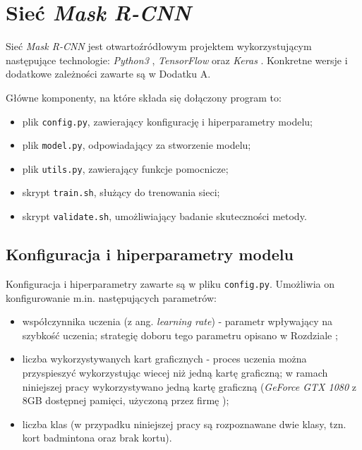 \newpage
\section{Sieć \textit{Mask R-CNN}}

Sieć \textit{Mask R-CNN} \cite{matterport-mask-rcnn} jest otwartoźródłowym projektem wykorzystującym następujące technologie: \textit{Python3} \cite{python}, \textit{TensorFlow} \cite{tensorflow} oraz \textit{Keras} \cite{keras}. Konkretne wersje i dodatkowe zależności zawarte są w Dodatku A.

Główne komponenty, na które składa się dołączony program to:

\begin{itemize}
  \item plik \texttt{config.py}, zawierający konfigurację i hiperparametry modelu;
  \item plik \texttt{model.py}, odpowiadający za stworzenie modelu;
  \item plik \texttt{utils.py}, zawierający funkcje pomocnicze;
  \item skrypt \texttt{train.sh}, służący do trenowania sieci;
  \item skrypt \texttt{validate.sh}, umożliwiający badanie skuteczności metody.
\end{itemize}

\subsection*{Konfiguracja i hiperparametry modelu}

Konfiguracja i hiperparametry zawarte są w pliku \texttt{config.py}. Umożliwia on konfigurowanie m.in. następujących parametrów:
\begin{itemize}
  \item współczynnika uczenia (z ang. \textit{learning rate}) - parametr wpływający na szybkość uczenia; strategię doboru tego parametru opisano w Rozdziale ;
  \item liczba wykorzystywanych kart graficznych - proces uczenia można przyspieszyć wykorzystując wiecej niż jedną kartę graficzną; w ramach niniejszej pracy wykorzystywano jedną kartę graficzną (\textit{GeForce GTX 1080} z 8GB dostępnej pamięci, użyczoną przez firmę \blue{});
  \item liczba klas (w przypadku niniejszej pracy są rozpoznawane dwie klasy, tzn. kort badmintona oraz brak kortu).
\end{itemize}

